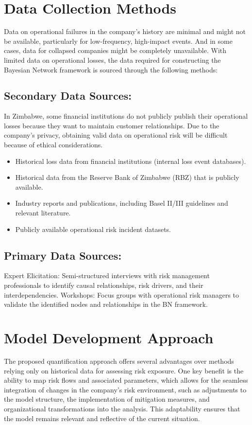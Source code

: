 \section{Data Collection Methods}
Data on operational failures in the company's history are minimal and might not be available, particularly for low-frequency, high-impact events. And in some cases, data for collapsed companies might be completely unavailable. With limited data on operational losses, the data required for constructing the Bayesian Network framework is sourced through the following methods:
\subsection{Secondary Data Sources:}
In Zimbabwe, some financial institutions do not publicly publish their operational losses because they want to maintain customer relationships. Due to the company’s privacy, obtaining valid data on operational risk will be difficult because of ethical considerations. 
\begin{itemize}
\item Historical loss data from financial institutions (internal loss event databases).
\item Historical data from the Reserve Bank of Zimbabwe (RBZ) that is publicly available. 
\item Industry reports and publications, including Basel II/III guidelines and relevant literature.
\item Publicly available operational risk incident datasets.
\end{itemize}
\subsection{{Primary Data Sources:}}
Expert Elicitation: Semi-structured interviews with risk management professionals to identify causal relationships, risk drivers, and their interdependencies.
Workshops: Focus groups with operational risk managers to validate the identified nodes and relationships in the BN framework.

\section{Model Development Approach}
The proposed quantification approach offers several advantages over methods relying only on historical data for assessing risk exposure. One key benefit is the ability to map risk flows and associated parameters, which allows for the seamless integration of changes in the company’s risk environment, such as adjustments to the model structure, the implementation of mitigation measures, and organizational transformations into the analysis. This adaptability ensures that the model remains relevant and reflective of the current situation. 

